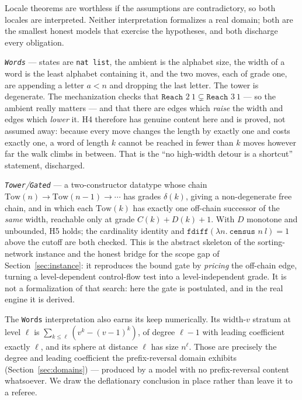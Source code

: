 \documentclass[11pt,a4paper]{article}
\theoremstyle{plain}
\theoremstyle{definition}
\theoremstyle{remark}
\begin{document}
Locale theorems are worthless if the assumptions are contradictory, so both
locales are interpreted. Neither interpretation formalizes a real domain; both
are the smallest honest models that exercise the hypotheses, and both discharge
every obligation.

\emph{\texttt{Words}} --- states are \texttt{nat list}, the ambient is the
alphabet size, the width of a word is the least alphabet containing it, and the
two moves, each of grade one, are appending a letter $a < n$ and dropping the
last letter. The tower is degenerate. The mechanization checks that
$\texttt{Reach } 2\ 1 \subsetneq \texttt{Reach } 3\ 1$ --- so the ambient
really matters --- and that there are edges which \emph{raise} the width and
edges which \emph{lower} it. H4 therefore has genuine content here and is
proved, not assumed away: because every move changes the length by exactly one
and costs exactly one, a word of length $k$ cannot be reached in fewer than $k$
moves however far the walk climbs in between. That is the ``no high-width
detour is a shortcut'' statement, discharged.

\emph{\texttt{Tower}/\texttt{Gated}} --- a two-constructor datatype whose chain
$\mathrm{Tow}(n) \to \mathrm{Tow}(n-1) \to \cdots$ has grades $\delta(k)$,
giving a non-degenerate free chain, and in which each $\mathrm{Tow}(k)$ has
exactly one off-chain successor of the \emph{same} width, reachable only at
grade $C(k) + D(k) + 1$. With $D$ monotone and unbounded, H5 holds; the
cardinality identity and $\texttt{fdiff}(\lambda n.\ \texttt{census } n\ l) = 1$
above the cutoff are both checked. This is the abstract skeleton of the
sorting-network instance and the honest bridge for the scope gap of
Section~\ref{sec:instance}: it reproduces the bound gate by \emph{pricing} the
off-chain edge, turning a level-dependent control-flow test into a
level-independent grade. It is not a formalization of that search: here the
gate is postulated, and in the real engine it is derived.

The \texttt{Words} interpretation also earns its keep numerically. Its
width-$v$ stratum at level $\ell$ is $\sum_{k \le \ell}(v^k - (v-1)^k)$, of
degree $\ell-1$ with leading coefficient exactly $\ell$, and its sphere at
distance $\ell$ has size $n^\ell$. Those are precisely the degree and leading
coefficient the prefix-reversal domain exhibits
(Section~\ref{sec:domains}) --- produced by a model with no prefix-reversal
content whatsoever. We draw the deflationary conclusion in place rather than
leave it to a referee.
\end{document}
